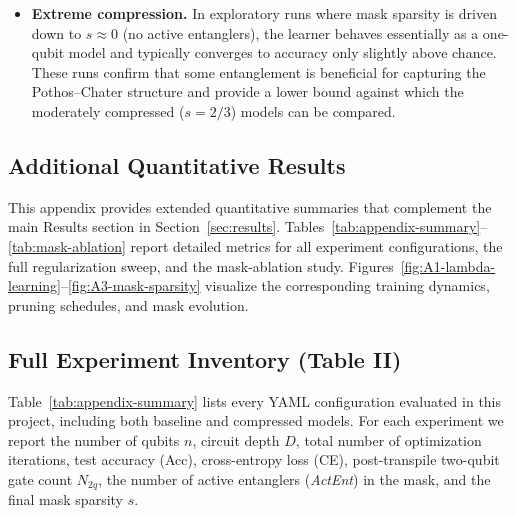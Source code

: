 \documentclass[conference]{IEEEtran}
\begin{document}
\begin{itemize}
    \item \textbf{Extreme compression.} In exploratory runs where mask sparsity is driven down to $s \approx 0$ (no active entanglers), the learner behaves essentially as a one-qubit model and typically converges to accuracy only slightly above chance. These runs confirm that some entanglement is beneficial for capturing the Pothos--Chater structure and provide a lower bound against which the moderately compressed ($s = 2/3$) models can be compared.
\end{itemize}

\subsection*{\textbf{Additional Quantitative Results}}
\label{appendix:additional-results}

This appendix provides extended quantitative summaries that complement the
main Results section in Section~\ref{sec:results}. Tables~\ref{tab:appendix-summary}--\ref{tab:mask-ablation}
report detailed metrics for all experiment configurations, the full
regularization sweep, and the mask-ablation study.  
Figures~\ref{fig:A1-lambda-learning}--\ref{fig:A3-mask-sparsity}
visualize the corresponding training dynamics, pruning schedules, and mask
evolution.

\subsection{Full Experiment Inventory (Table II)}

Table~\ref{tab:appendix-summary} lists every YAML configuration evaluated in
this project, including both baseline and compressed models. For each
experiment we report the number of qubits $n$, circuit depth $D$, total number
of optimization iterations, test accuracy (Acc), cross-entropy loss (CE),
post-transpile two-qubit gate count $N_{2q}$, the number of active entanglers
(\textit{ActEnt}) in the mask, and the final mask sparsity $s$.
\end{document}
